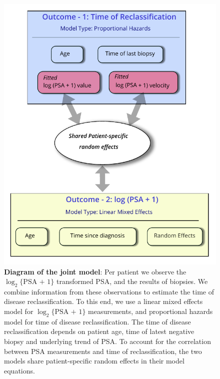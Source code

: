 \begin{figure}[!htb]
\centerline{\includegraphics[width=\columnwidth]{images/jm_blockdiag.pdf}}
\caption{\textbf{Diagram of the joint model}: Per patient we observe the $\log_2\{\mbox{PSA + 1}\}$ transformed PSA, and the results of biopsies. We combine information from these observations to estimate the time of disease reclassification. To this end, we use a linear mixed effects model for $\log_2\{\mbox{PSA + 1}\}$ measurements, and proportional hazards model for time of disease reclassification. The time of disease reclassification depends on patient age, time of latest negative biopsy and underlying trend of PSA. To account for the correlation between PSA measurements and time of reclassification, the two models share patient-specific random effects in their model equations.}
\label{fig:jm_blockdiag}
\end{figure}

